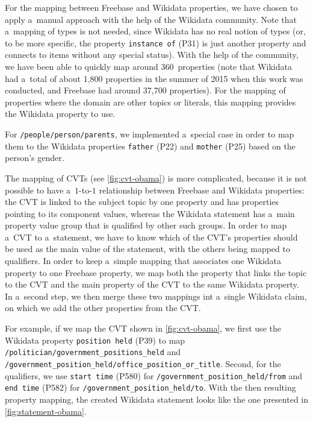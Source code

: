 \documentclass{sig-alternate-2013}
\begin{document}
For the mapping between Freebase and Wikidata properties, we have chosen to apply a~manual
approach with the help of the Wikidata community.
Note that a~mapping of types is not needed, since Wikidata has no real notion of types
(or, to be more specific, the property \texttt{instance of} (P31) is just another
property and connects to items without any special status).
With the help of the community, we have been able to quickly map around 360~properties
(note that Wikidata had a~total of about 1,800 properties in the summer of 2015 when this work
was conducted, and Freebase had around 37,700 properties).
For the mapping of properties where the domain are other topics or literals,
this mapping provides the Wikidata property to use.

For \texttt{/people/person/parents}, we implemented a~special case
in order to map them to the Wikidata properties
\texttt{father} (P22) and \texttt{mother} (P25)
based on the person's gender.

\break The mapping of CVTs (see \autoref{fig:cvt-obama}) is more complicated,
because it is not possible to have a~\mbox{$1$-to-$1$} relationship
between Freebase and Wikidata properties: the CVT is linked to the subject topic by one property
and has properties pointing to its component values, whereas the Wikidata statement
has a~main property value group that is qualified by other such groups.
In order to map a~CVT to a~statement, we have to know which of the CVT's properties
should be used as the main value of the statement, with the others being mapped to qualifiers.
In order to keep a~simple mapping that associates one Wikidata property to one Freebase property,
we map both the property that links the topic to the CVT
and the main property of the CVT to the same Wikidata property. In a~second step, we
then merge these two mappings int a~single Wikidata claim, on which we add the
other properties from the CVT.

For example, if we map the CVT shown in \autoref{fig:cvt-obama},
we first use the Wikidata property \texttt{position held} (P39) to map
\texttt{/politician/government\_positions\_held} and \linebreak
\texttt{/government\_position\_held/office\_position\_or\_title}. \linebreak
Second, for the qualifiers, we use \texttt{start time} (P580)
for \texttt{/government\_position\_held/from} and \texttt{end time} (P582)
for \texttt{/government\_position\_held/to}.
With the then resulting \linebreak property mapping, the created Wikidata statement
looks like the one presented in \autoref{fig:statement-obama}.
\end{document}
